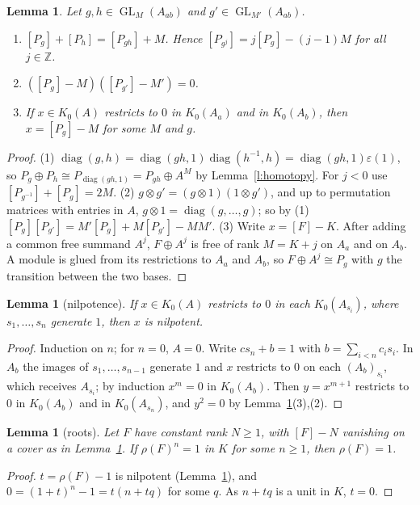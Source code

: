\documentclass[11pt]{amsart}
\newtheorem{lemma}[theorem]{Lemma}
\theoremstyle{definition}
\theoremstyle{remark}
\newcommand{\GL}{\operatorname{GL}}
\newcommand{\diag}{\operatorname{diag}}
\begin{document}
\begin{lemma}\label{l:split}
Let $g,h\in\GL_M(A_{ab})$ and $g'\in\GL_{M'}(A_{ab})$.
\begin{enumerate}
\item $[P_g]+[P_h]=[P_{gh}]+M$. Hence $[P_{g^{j}}]=j[P_g]-(j-1)M$ for all
  $j\in\mathbb Z$.
\item $([P_g]-M)([P_{g'}]-M')=0$.
\item If $x\in K_0(A)$ restricts to $0$ in $K_0(A_a)$ and in $K_0(A_b)$, then
  $x=[P_g]-M$ for some $M$ and $g$.
\end{enumerate}
\end{lemma}
\begin{proof}
(1) $\diag(g,h)=\diag(gh,1)\diag(h^{-1},h)=\diag(gh,1)\varepsilon(1)$, so
$P_g\oplus P_h\cong P_{\diag(gh,1)}=P_{gh}\oplus A^M$ by
Lemma~\ref{l:homotopy}. For $j<0$ use $[P_{g^{-1}}]+[P_g]=2M$.
(2) $g\otimes g'=(g\otimes1)(1\otimes g')$, and up to permutation matrices
with entries in $A$, $g\otimes1=\diag(g,\dots,g)$; so by (1)
$[P_g][P_{g'}]=M'[P_g]+M[P_{g'}]-MM'$.
(3) Write $x=[F]-K$. After adding a common free summand $A^j$, $F\oplus A^j$
is free of rank $M=K+j$ on $A_a$ and on $A_b$. A module is glued from its
restrictions to $A_a$ and $A_b$, so $F\oplus A^j\cong P_g$ with $g$ the
transition between the two bases.
\end{proof}

\begin{lemma}[nilpotence]\label{l:nil}
If $x\in K_0(A)$ restricts to $0$ in each $K_0(A_{s_i})$, where
$s_1,\dots,s_n$ generate $1$, then $x$ is nilpotent.
\end{lemma}
\begin{proof}
Induction on $n$; for $n=0$, $A=0$. Write $cs_n+b=1$ with
$b=\sum_{i<n}c_is_i$. In $A_b$ the images of $s_1,\dots,s_{n-1}$ generate
$1$ and $x$ restricts to $0$ on each $(A_b)_{s_i}$, which receives
$A_{s_i}$; by induction $x^m=0$ in $K_0(A_b)$. Then $y=x^{m+1}$ restricts
to $0$ in $K_0(A_b)$ and in $K_0(A_{s_n})$, and $y^2=0$ by
Lemma~\ref{l:split}(3),(2).
\end{proof}

\begin{lemma}[roots]\label{l:roots}
Let $F$ have constant rank $N\geq1$, with $[F]-N$ vanishing on a cover as
in Lemma~\ref{l:nil}. If $\rho(F)^n=1$ in $K$ for some $n\ge1$, then
$\rho(F)=1$.
\end{lemma}
\begin{proof}
$t=\rho(F)-1$ is nilpotent (Lemma~\ref{l:nil}), and
$0=(1+t)^n-1=t(n+tq)$ for some $q$. As $n+tq$ is a unit in $K$, $t=0$.
\end{proof}
\end{document}
